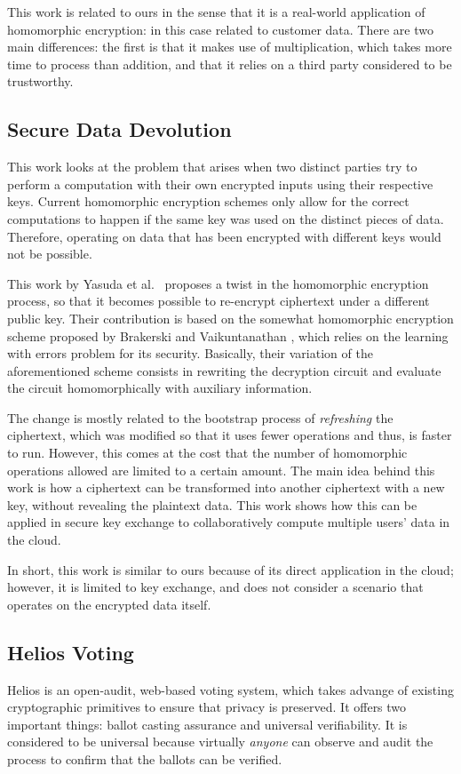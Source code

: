 This work is related to ours in the sense that it is a real-world application of homomorphic encryption: in this case related to customer data. There are two main differences: the first is that it makes use of multiplication, which takes more time to process than addition, and that it relies on a third party considered to be trustworthy. 

\subsection{Secure Data Devolution}
This work looks at the problem that arises when two distinct parties try to perform a computation with their own encrypted inputs using their respective keys. Current homomorphic encryption schemes only allow for the correct computations to happen if the same key was used on the distinct pieces of data. Therefore, operating on data that has been encrypted with different keys would not be possible. 

This work by Yasuda et al.\ \cite{Yasuda:2015:SDD:2732516.2732521} proposes a twist in the homomorphic encryption process, so that it becomes possible to re-encrypt ciphertext under a different public key. Their contribution is based on the somewhat homomorphic encryption scheme proposed by  Brakerski and Vaikuntanathan \cite{cryptoeprint:2011:277}, which relies on the learning with errors problem for its security.  Basically, their variation of the aforementioned scheme consists in rewriting the decryption circuit and evaluate the circuit homomorphically with auxiliary information.

The change is mostly related to the bootstrap process of \emph{refreshing} the ciphertext, which was modified so that it uses fewer operations and thus, is faster to run. However, this comes at the cost that the number of homomorphic operations allowed are limited to a certain amount. The main idea behind this work is how a ciphertext can be transformed into another ciphertext with a new key, without revealing the plaintext data. This work shows how this can be applied in secure key exchange to collaboratively compute multiple users' data in the cloud.

In short, this work is similar to ours because of its direct application in the cloud; however, it is limited to key exchange, and does not consider a scenario that operates on the encrypted data itself.

\subsection{{Helios Voting}}
Helios \cite{adida2008helios} is an open-audit, web-based voting system, which takes advange of existing cryptographic primitives to ensure that privacy is preserved. It offers two important things: ballot casting assurance and universal verifiability. It is considered to be universal because virtually \emph{anyone} can observe and audit the process to confirm that the ballots can be verified.

